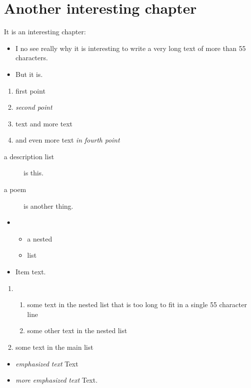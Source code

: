 \chapter{Another interesting chapter}
\label{s:2}
It is an interesting chapter:
\begin{itemize}
\item I no see really why it is interesting to write a very long text of more than
55 characters.
\item But it is.
\end{itemize}
\begin{enumerate}
\item first point
\item \emph{second point}
\item text 
and more text
\item and even more text
\emph{in fourth point}
\end{enumerate}
\begin{description}
\item[a description list] is this.
\item[a poem] is another thing.
\end{description}
\begin{itemize}
\item \begin{itemize}
\item a nested
\item list
\end{itemize}

\item Item text.
\end{itemize}
\begin{enumerate}
\item \begin{enumerate}
\item some text in the nested list that is too long to fit in a single 55 character line
\item some other text in the nested list
\end{enumerate}

\item some text in the main list
\end{enumerate}
\begin{itemize}
\item \emph{emphasized text}
Text
\item \emph{more emphasized text}
Text.
\end{itemize}
